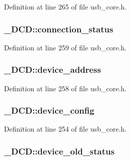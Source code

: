Definition at line 265 of file usb\-\_\-core.\-h.

\hypertarget{struct___d_c_d_a7fe0642fd4366eeed640ebdb46e5c0f2}{
\subsubsection[{connection\-\_\-status}]{ \-\_\-\-D\-C\-D\-::connection\-\_\-status}}\label{struct___d_c_d_a7fe0642fd4366eeed640ebdb46e5c0f2}


Definition at line 259 of file usb\-\_\-core.\-h.

\hypertarget{struct___d_c_d_aeb1db0c0aeccfb65ef9274ae11e1d2ab}{
\subsubsection[{device\-\_\-address}]{ \-\_\-\-D\-C\-D\-::device\-\_\-address}}\label{struct___d_c_d_aeb1db0c0aeccfb65ef9274ae11e1d2ab}


Definition at line 258 of file usb\-\_\-core.\-h.

\hypertarget{struct___d_c_d_a1d220b3eff4ee2e13baa868155edece3}{
\subsubsection[{device\-\_\-config}]{ \-\_\-\-D\-C\-D\-::device\-\_\-config}}\label{struct___d_c_d_a1d220b3eff4ee2e13baa868155edece3}


Definition at line 254 of file usb\-\_\-core.\-h.

\hypertarget{struct___d_c_d_af4c781790689d2aa0c23ed2a928d14d3}{
\subsubsection[{device\-\_\-old\-\_\-status}]{ \-\_\-\-D\-C\-D\-::device\-\_\-old\-\_\-status}}\label{struct___d_c_d_af4c781790689d2aa0c23ed2a928d14d3}


